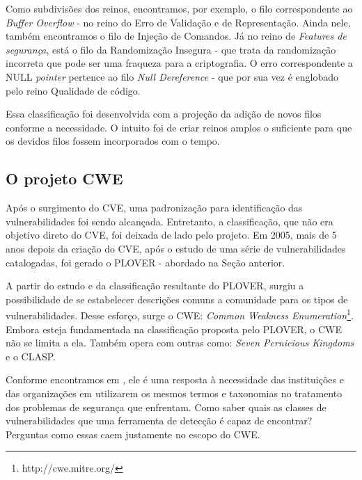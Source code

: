 			
			Como subdivisões dos reinos, encontramos, por exemplo, o filo correspondente ao
			\textsl{Buffer Overflow} - no reino do Erro de Validação e de Representação.
			Ainda nele, também encontramos o filo de Injeção de Comandos.			
			Já no reino de \textsl{Features de segurança}, está o filo da Randomização Insegura -
			que trata da randomização incorreta que pode ser uma fraqueza para a criptografia.
			O erro correspondente a NULL \textsl{pointer} pertence ao filo \textsl{Null Dereference} -
			que por sua vez é englobado pelo reino Qualidade de código.
			

			Essa classificação foi desenvolvida com a projeção da adição de novos filos
			conforme a necessidade. O intuito foi de criar reinos amplos o suficiente para que
			os devidos filos fossem incorporados com o tempo.

		
		\subsection{O projeto CWE}
			\label{subsec:cwe}
			Após o surgimento do CVE, uma padronização para identificação das vulnerabilidades
			foi sendo alcançada. Entretanto, a classificação, que não era objetivo direto do CVE,
			foi deixada de lado pelo projeto. Em 2005, mais de 5 anos depois da criação do CVE, 
			após o estudo de uma série de vulnerabilidades catalogadas, foi 
			gerado o PLOVER - abordado na Seção anterior.
			

			A partir do estudo e da classificação resultante do PLOVER, surgiu a possibilidade
			de se estabelecer descrições comuns a comunidade para os tipos de vulnerabilidades.
			Desse esforço, surge o CWE: \textsl{Common Weakness Enumeration}\footnote{http://cwe.mitre.org/}.
			Embora esteja fundamentada na classificação proposta pelo PLOVER, o CWE não se limita
			a ela. Também opera com outras como: \textsl{Seven Pernicious Kingdoms} e o CLASP.

			
			Conforme encontramos em \cite{CWEAbout}, ele é uma resposta à necessidade das instituições
			e das organizações em utilizarem os mesmos termos e taxonomias no tratamento dos
			problemas de segurança que enfrentam. Como saber quais as classes de vulnerabilidades
			que uma ferramenta de detecção é capaz de encontrar? Perguntas como essas caem justamente
			no escopo do CWE.
			


